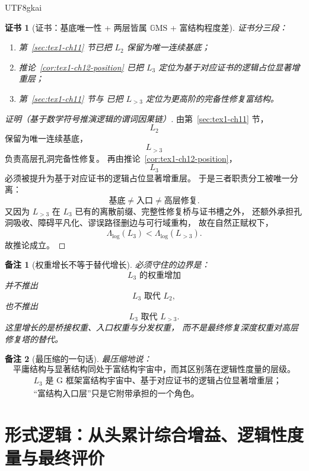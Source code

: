 \documentclass[12pt]{article}
\newtheorem{remark}{备注}[section]
\newtheorem{Certificate}{证书}[section]
\newcommand{\GMS}{\mathbb{G}\mathrm{MS}}
\begin{document}
\begin{CJK*}{UTF8}{gkai}
\begin{Certificate}[证书：基底唯一性 + 两层皆属 \(\GMS\) + 富结构程度差]
\label{cert:tex1-ch12-split}
证书分三段：
\begin{enumerate}
  \item 第~\ref{sec:tex1-ch11} 节已把 \(L_2\) 保留为唯一连续基底；
  \item 推论~\ref{cor:tex1-ch12-position} 已把 \(L_3\) 定位为基于对应证书的逻辑占位显著增重层；
  \item 第~\ref{sec:tex1-ch11} 节与 \cite{RepoTex41HomotopyRepairBundle} 已把 \(L_{>3}\) 定位为更高阶的完备性修复富结构。
\end{enumerate}
\end{Certificate}

\begin{proof}[证明（基于数学符号推演逻辑的谓词因果链）]
由第~\ref{sec:tex1-ch11} 节，
\[
  L_2
\]
保留为唯一连续基底，
\[
  L_{>3}
\]
负责高层孔洞完备性修复。
再由推论~\ref{cor:tex1-ch12-position}，
\[
  L_3
\]
必须被提升为基于对应证书的逻辑占位显著增重层。
于是三者职责分工被唯一分离：
\[
  \text{基底}\neq\text{入口}\neq\text{高层修复}.
\]
又因为 \(L_{>3}\) 在 \(L_3\) 已有的离散前缀、完整性修复桥与证书槽之外，
还额外承担孔洞吸收、障碍平凡化、谬误路径删边与可行域重构，
故在自然正赋权下，
\[
  \Lambda_{\mathrm{log}}(L_3)<\Lambda_{\mathrm{log}}(L_{>3}).
\]
故推论成立。
\end{proof}

\begin{remark}[权重增长不等于替代增长]
必须守住的边界是：
\[
  L_3\text{ 的权重增加}
\]
并不推出
\[
  L_3\text{ 取代 }L_2,
\]
也不推出
\[
  L_3\text{ 取代 }L_{>3}.
\]
这里增长的是桥接权重、入口权重与分发权重，
而不是最终修复深度权重对高层修复塔的替代。
\end{remark}

\begin{remark}[最压缩的一句话]
最压缩地说：
\[
  \boxed{
    \text{平庸结构与显著结构同处于富结构宇宙中，而其区别落在逻辑性度量的层级。}
  }
\]
\[
  \boxed{
    \begin{aligned}
      &L_3\text{ 是 G 框架富结构宇宙中、基于对应证书的逻辑占位显著增重层；}\\
      &\text{“富结构入口层”只是它附带承担的一个角色。}
    \end{aligned}
  }
\]
\end{remark}

\clearpage
\section{形式逻辑：从头累计综合增益、逻辑性度量与最终评价}
\label{sec:tex1-ch6}


\end{CJK*}
\end{document}

